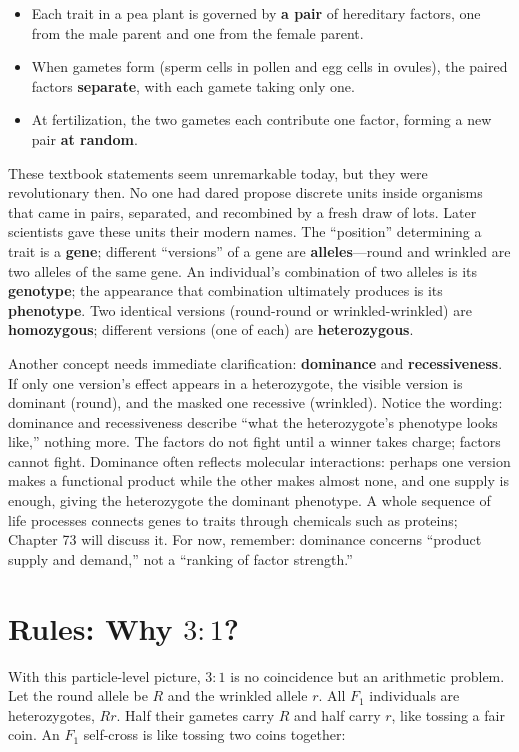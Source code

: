 \begin{itemize}[itemsep=2pt]
\item Each trait in a pea plant is governed by \textbf{a pair} of hereditary factors, one from the male parent and one from the female parent.
\item When gametes form (sperm cells in pollen and egg cells in ovules), the paired factors \textbf{separate}, with each gamete taking only one.
\item At fertilization, the two gametes each contribute one factor, forming a new pair \textbf{at random}.
\end{itemize}

These textbook statements seem unremarkable today, but they were revolutionary then. No one had dared propose discrete units inside organisms that came in pairs, separated, and recombined by a fresh draw of lots. Later scientists gave these units their modern names. The ``position'' determining a trait is a \textbf{gene}; different ``versions'' of a gene are \textbf{alleles}---round and wrinkled are two alleles of the same gene. An individual's combination of two alleles is its \textbf{genotype}; the appearance that combination ultimately produces is its \textbf{phenotype}. Two identical versions (round-round or wrinkled-wrinkled) are \textbf{homozygous}; different versions (one of each) are \textbf{heterozygous}.

Another concept needs immediate clarification: \textbf{dominance} and \textbf{recessiveness}. If only one version's effect appears in a heterozygote, the visible version is dominant (round), and the masked one recessive (wrinkled). Notice the wording: dominance and recessiveness describe ``what the heterozygote's phenotype looks like,'' nothing more. The factors do not fight until a winner takes charge; factors cannot fight. Dominance often reflects molecular interactions: perhaps one version makes a functional product while the other makes almost none, and one supply is enough, giving the heterozygote the dominant phenotype. A whole sequence of life processes connects genes to traits through chemicals such as proteins; Chapter 73 will discuss it. For now, remember: dominance concerns ``product supply and demand,'' not a ``ranking of factor strength.''

\section{Rules: Why $3:1$?}

With this particle-level picture, $3:1$ is no coincidence but an arithmetic problem. Let the round allele be $R$ and the wrinkled allele $r$. All $F_1$ individuals are heterozygotes, $Rr$. Half their gametes carry $R$ and half carry $r$, like tossing a fair coin. An $F_1$ self-cross is like tossing two coins together:

